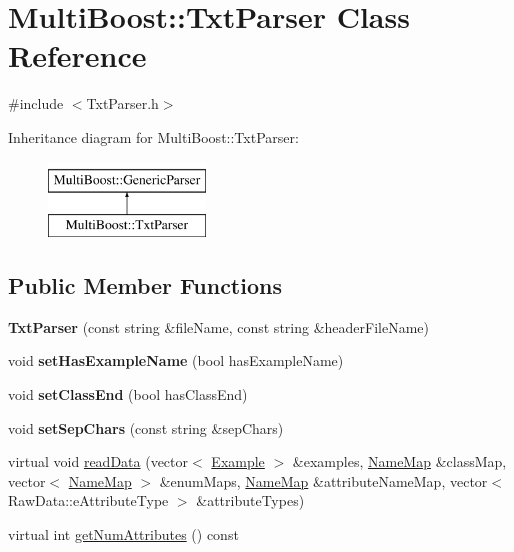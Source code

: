 \hypertarget{classMultiBoost_1_1TxtParser}{\section{Multi\-Boost\-:\-:Txt\-Parser Class Reference}
\label{classMultiBoost_1_1TxtParser}
}


{\ttfamily \#include $<$Txt\-Parser.\-h$>$}

Inheritance diagram for Multi\-Boost\-:\-:Txt\-Parser\-:\begin{figure}[H]
\begin{center}
\leavevmode
\includegraphics[height=2.000000cm]{classMultiBoost_1_1TxtParser}
\end{center}
\end{figure}
\subsection*{Public Member Functions}
\begin{DoxyCompactItemize}
\item 
\hypertarget{classMultiBoost_1_1TxtParser_a3ae9f6d6cdc97929debd43077878b482}{{\bfseries Txt\-Parser} (const string \&file\-Name, const string \&header\-File\-Name)}\label{classMultiBoost_1_1TxtParser_a3ae9f6d6cdc97929debd43077878b482}

\item 
\hypertarget{classMultiBoost_1_1TxtParser_a99dc7bc6fd460824bee306286e27f0ea}{void {\bfseries set\-Has\-Example\-Name} (bool has\-Example\-Name)}\label{classMultiBoost_1_1TxtParser_a99dc7bc6fd460824bee306286e27f0ea}

\item 
\hypertarget{classMultiBoost_1_1TxtParser_ad49833faf09b22abe614eb2c674cc212}{void {\bfseries set\-Class\-End} (bool has\-Class\-End)}\label{classMultiBoost_1_1TxtParser_ad49833faf09b22abe614eb2c674cc212}

\item 
\hypertarget{classMultiBoost_1_1TxtParser_ac7a8a79de24b4f53a02baea4d84e536f}{void {\bfseries set\-Sep\-Chars} (const string \&sep\-Chars)}\label{classMultiBoost_1_1TxtParser_ac7a8a79de24b4f53a02baea4d84e536f}

\item 
virtual void \hyperlink{classMultiBoost_1_1TxtParser_a2e1dc396f688ebc41861d7c29122293f}{read\-Data} (vector$<$ \hyperlink{classMultiBoost_1_1Example}{Example} $>$ \&examples, \hyperlink{classMultiBoost_1_1NameMap}{Name\-Map} \&class\-Map, vector$<$ \hyperlink{classMultiBoost_1_1NameMap}{Name\-Map} $>$ \&enum\-Maps, \hyperlink{classMultiBoost_1_1NameMap}{Name\-Map} \&attribute\-Name\-Map, vector$<$ Raw\-Data\-::e\-Attribute\-Type $>$ \&attribute\-Types)
\item 
virtual int \hyperlink{classMultiBoost_1_1TxtParser_a9654db113c2a4c15966f01e598c9c675}{get\-Num\-Attributes} () const 
\end{DoxyCompactItemize}
